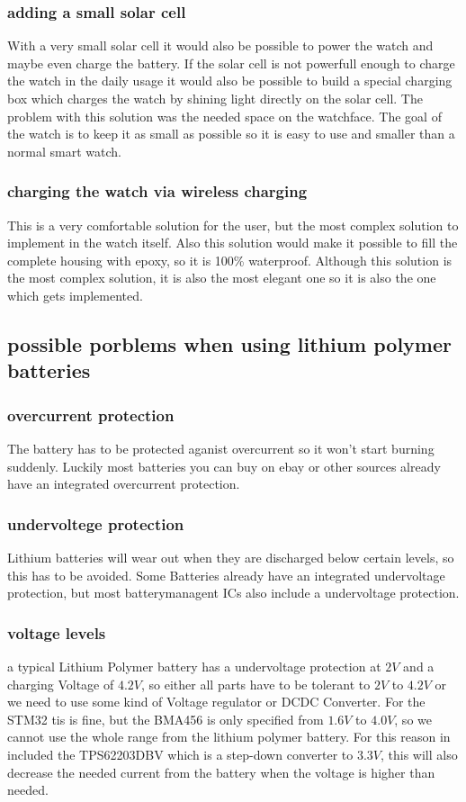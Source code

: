 \subsubsection{adding a small solar cell}
With a very small solar cell it would also be possible to power the watch and maybe even charge the battery. If the solar cell is not powerfull enough to charge the watch in the daily usage it would also be possible to build a special charging box which charges the watch by shining light directly on the solar cell. 
The problem with this solution was the needed space on the watchface. The goal of the watch is to keep it as small as possible so it is easy to use and smaller than a normal smart watch.
\subsubsection{charging the watch via wireless charging}
This is a very comfortable solution for the user, but the most complex solution to implement in the watch itself. 
Also this solution would make it possible to fill the complete housing with epoxy, so it is 100\% waterproof.
Although this solution is the most complex solution, it is also the most elegant one so it is also the one which gets implemented.
\subsection{possible porblems when using lithium polymer batteries}
\subsubsection{overcurrent protection}
The battery has to be protected aganist overcurrent so it won't start burning suddenly. Luckily most batteries you can buy on ebay or other sources already have an integrated overcurrent protection.
\subsubsection{undervoltege protection}
Lithium batteries will wear out when they are discharged below certain levels, so this has to be avoided. Some Batteries already have an integrated undervoltage protection, but most batterymanagent ICs also include a undervoltage protection.
\subsubsection{voltage levels}
a typical Lithium Polymer battery has a undervoltage protection at $2V$ and a charging Voltage of $4.2V$, so either all parts have to be tolerant to $2V$ to $4.2V$ or we need to use some kind of Voltage regulator or DCDC Converter. For the STM32 tis is fine, but the BMA456 is only specified from $1.6V$ to $4.0V$, so we cannot use the whole range from the lithium polymer battery. For this reason in included the TPS62203DBV which is a step-down converter to $3.3V$, this will also decrease the needed current from the battery when the voltage is higher than needed.
